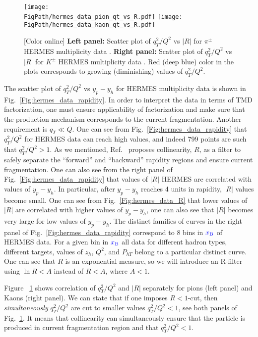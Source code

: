 \documentclass[final,3p,times,onecolumn,sort&compress,hidelinks]{elsarticle}
\newcommand{\xbj}{\ensuremath{{\cbl x_{\rm B}}}}
\newcommand\3[1]{\boldsymbol{#1}}
\newcommand{\cbl}{\color{blue}}
\newcommand*{\FigPath}{../Figs/}%
\begin{document}
\begin{figure}[htb!]
\centering
\texttt{[image: \\FigPath/hermes\_data\_pion\_qt\_vs\_R.pdf]}
\texttt{[image: \\FigPath/hermes\_data\_kaon\_qt\_vs\_R.pdf]}
\caption{\label{Fig:hermes_data_qt_vs_R}
[Color online] {\bf Left panel:} Scatter plot of $q_T^2/Q^2$ vs $|R|$ for $\pi^\pm$ HERMES multiplicity data . {\bf Right panel:} 
Scatter plot of $q_T^2/Q^2$ vs $|R|$ for $K^\pm$ HERMES multiplicity data . Red (deep blue) color in the plots corresponds to growing (diminishing) values of $q_T^2/Q^2$.
}
\end{figure}
The scatter plot of  $q_T^2/Q^2$ vs $y_p-y_h$ for HERMES multiplicity data is shown in Fig.~\ref{Fig:hermes_data_rapidity}. In order to interpret the data in terms of TMD factorization, one must ensure applicability of factorization and make sure that the production mechanism corresponds to the current fragmentation. Another requirement is $q_T \ll Q$. One can see from Fig.~\ref{Fig:hermes_data_rapidity} that  $q_T^2/Q^2$ for HERMES data can reach high values, and indeed 799 points are such that $q_T^2/Q^2>1$. As we mentioned, Ref.~\cite{Boglione:2016bph} proposes collinearity, $R$, as a filter to  safely separate the ``forward'' and ``backward'' rapidity regions and ensure current fragmentation. One can also see from the right panel of Fig.~\ref{Fig:hermes_data_rapidity}  that values of $|R|$ HERMES are correlated with values of $y_p-y_h$. In particular, after $y_p-y_h$ reaches 4 units in rapidity, $|R|$ values become small. One can see from Fig.~\ref{Fig:hermes_data_R} that lower values of $|R|$ are correlated with higher values of $y_p-y_h$, one can also see that $|R|$ becomes very large for low values of $y_p-y_h$. The distinct families of curves in the right panel of Fig.~\ref{Fig:hermes_data_rapidity} correspond to 8 bins in $\xbj$ of HERMES data. For a given bin in $\xbj$ all data for different hadron types, different targets, values of $z_h$, $Q^2$, and $P_{hT}$ belong to a particular distinct curve. One can see that $R$ is an exponential measure, so we will introduce an R-filter using $\ln R < A$ instead of $R < A$, where $A < 1$. 


Figure ~\ref{Fig:hermes_data_qt_vs_R} shows correlation of $q_T^2/Q^2$ and $|R|$ separately for pions (left panel) and Kaons (right panel).
We can state that if one imposes $R<1$-cut, then {\em simultaneously}  $q_T^2/Q^2$ are cut to smaller values $q_T^2/Q^2<1$, see both panels of Fig.~\ref{Fig:hermes_data_qt_vs_R}. It means that collinearity can simultaneously ensure that the particle is produced in current fragmentation region and that $q_T^2/Q^2<1$.
\end{document}
